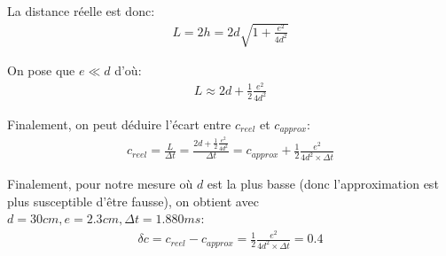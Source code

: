 \documentclass[12pt]{article}
\begin{document}
La distance réelle est donc:
\begin{align}
	L = 2h = 2d\sqrt{1 + \frac{e^2}{4d^2}}
\end{align}

On pose que $e \ll d$ d'où:
\begin{align}
	L \approx 2d + \frac{1}{2} \frac{e^2}{4d^2}
\end{align}

Finalement, on peut déduire l'écart entre $c_{reel}$ et $c_{approx}$:
\begin{align}
	c_{reel} = \frac{L}{\Delta t} = \frac{2d + \frac{1}{2}\frac{e^2}{4d^2}}{\Delta t} = c_{approx} + \frac{1}{2}\frac{e^2}{4d^2 \times \Delta t}
\end{align}

Finalement, pour notre mesure où $d$ est la plus basse (donc l'approximation est plus susceptible d'être fausse), on obtient avec $d=30cm, e=2.3cm, \Delta t = 1.880ms$:
\begin{align}
	\delta c = c_{reel} - c_{approx} = \frac{1}{2}\frac{e^2}{4d^2 \times \Delta t} = 0.4
\end{align}
\end{document}

